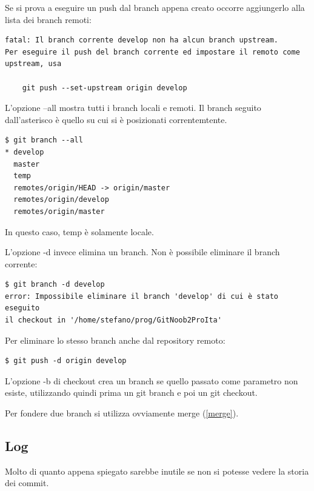 \documentclass{article}
\begin{document}
Se si prova a eseguire un push dal branch appena creato occorre
aggiungerlo alla lista dei branch remoti:

\begin{verbatim}
fatal: Il branch corrente develop non ha alcun branch upstream.
Per eseguire il push del branch corrente ed impostare il remoto come upstream, usa

    git push --set-upstream origin develop
\end{verbatim}

L'opzione --all mostra tutti i branch locali e remoti. Il branch seguito
dall'asterisco è quello su cui si è posizionati correntemtente.

\begin{verbatim}
$ git branch --all
* develop
  master
  temp
  remotes/origin/HEAD -> origin/master
  remotes/origin/develop
  remotes/origin/master
\end{verbatim}

In questo caso, temp è solamente locale.

L'opzione -d invece elimina un branch. Non è possibile eliminare il branch corrente:

\begin{verbatim}
$ git branch -d develop
error: Impossibile eliminare il branch 'develop' di cui è stato eseguito 
il checkout in '/home/stefano/prog/GitNoob2ProIta'
\end{verbatim}

Per eliminare lo stesso branch anche dal repository remoto:

\begin{verbatim}
$ git push -d origin develop
\end{verbatim}

L'opzione -b di checkout crea un branch se quello passato come parametro non
esiste, utilizzando quindi prima un git branch e poi un git checkout.

Per fondere due branch si utilizza ovviamente merge (\ref{merge}).

\subsection{Log\label{log}}
Molto di quanto appena spiegato sarebbe inutile se non si potesse vedere la
storia dei commit.
\end{document}
